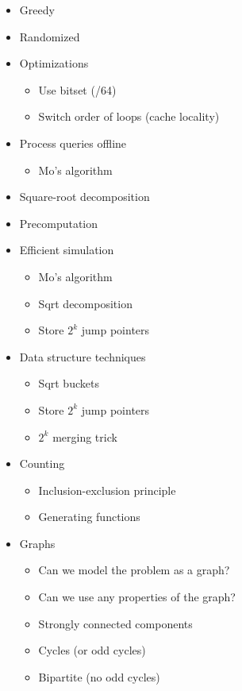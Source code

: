 \documentclass[8pt,a4paper,landscape,oneside]{amsart}
\newenvironment{myitemize}
{\begin{itemize}[leftmargin=.3cm]
	\setlength{\itemsep}{0pt}
	\setlength{\parskip}{0pt}
	\setlength{\parsep}{0pt}     }
{ \end{itemize}                  }
\begin{document}
\begin{multicols*}{3}
\begin{myitemize}
\begin{itemize}
\begin{itemize}
\begin{itemize}
						\end{itemize}
				\end{itemize}
		\end{itemize}
	\item Greedy
	\item Randomized
	\item Optimizations
		\begin{itemize}
			\item Use bitset (/64)
			\item Switch order of loops (cache locality)
		\end{itemize}
	\item Process queries offline
		\begin{itemize}
			\item Mo's algorithm
		\end{itemize}
	\item Square-root decomposition
	\item Precomputation
	\item Efficient simulation
		\begin{itemize}
			\item Mo's algorithm
			\item Sqrt decomposition
			\item Store $2^k$ jump pointers
		\end{itemize}
	\item Data structure techniques
		\begin{itemize}
			\item Sqrt buckets
			\item Store $2^k$ jump pointers
			\item $2^k$ merging trick
		\end{itemize}
	\item Counting
		\begin{itemize}
			\item Inclusion-exclusion principle
			\item Generating functions
		\end{itemize}
	\item Graphs
		\begin{itemize}
			\item Can we model the problem as a graph?
			\item Can we use any properties of the graph?
			\item Strongly connected components
			\item Cycles (or odd cycles)
			\item Bipartite (no odd cycles)

\end{itemize}
\end{myitemize}
\end{multicols*}
\end{document}
